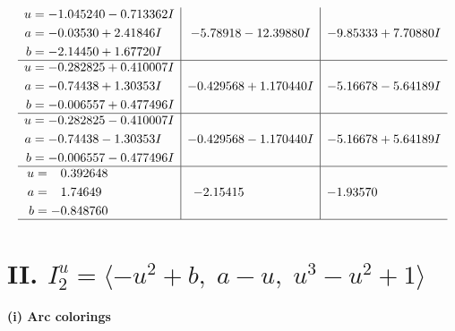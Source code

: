\documentclass[1p]{elsarticle_modified}
\theoremstyle{definition}
\begin{document}
$$\begin{array}{c|c|c}
\begin{aligned}
u &= -1.045240 - 0.713362 I \\
a &= -0.03530 + 2.41846 I \\
b &= -2.14450 + 1.67720 I\end{aligned}
 & -5.78918 - 12.39880 I & -9.85333 + 7.70880 I \\ \hline\begin{aligned}
u &= -0.282825 + 0.410007 I \\
a &= -0.74438 + 1.30353 I \\
b &= -0.006557 + 0.477496 I\end{aligned}
 & -0.429568 + 1.170440 I & -5.16678 - 5.64189 I \\ \hline\begin{aligned}
u &= -0.282825 - 0.410007 I \\
a &= -0.74438 - 1.30353 I \\
b &= -0.006557 - 0.477496 I\end{aligned}
 & -0.429568 - 1.170440 I & -5.16678 + 5.64189 I \\ \hline\begin{aligned}
u &= \phantom{-}0.392648\phantom{ +0.000000I} \\
a &= \phantom{-}1.74649\phantom{ +0.000000I} \\
b &= -0.848760\phantom{ +0.000000I}\end{aligned}
 & -2.15415\phantom{ +0.000000I} & -1.93570\phantom{ +0.000000I}\\
 \hline 
 \end{array}$$\newpage\newpage\renewcommand{\arraystretch}{1}
\centering \section*{II. $I^u_{2}= \langle - u^2+b,\;a- u,\;u^3- u^2+1 \rangle$}
\flushleft \textbf{(i) Arc colorings}\\
\end{document}

